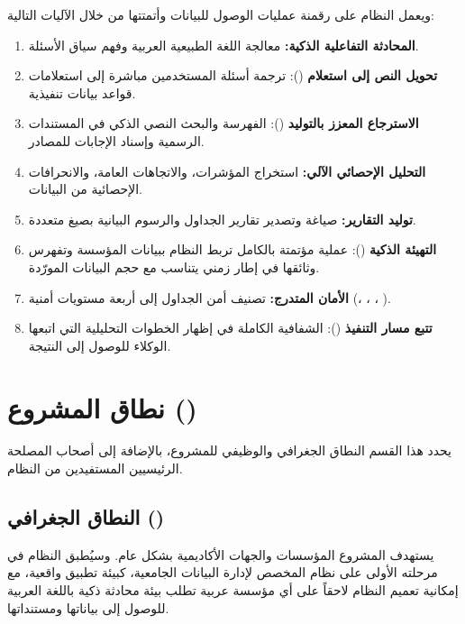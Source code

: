 ويعمل النظام على رقمنة عمليات الوصول للبيانات وأتمتتها من خلال الآليات
التالية:

\begin{enumerate}
  \item \textbf{المحادثة التفاعلية الذكية:} معالجة اللغة الطبيعية العربية وفهم
        سياق الأسئلة.
  \item \textbf{تحويل النص إلى استعلام} (): ترجمة أسئلة المستخدمين
        مباشرة إلى استعلامات قواعد بيانات تنفيذية.
  \item \textbf{الاسترجاع المعزز بالتوليد} (): الفهرسة والبحث النصي
        الذكي في المستندات الرسمية وإسناد الإجابات للمصادر.
  \item \textbf{التحليل الإحصائي الآلي:} استخراج المؤشرات، والاتجاهات العامة،
        والانحرافات الإحصائية من البيانات.
  \item \textbf{توليد التقارير:} صياغة وتصدير تقارير الجداول والرسوم البيانية
        بصيغ متعددة.
  \item \textbf{التهيئة الذكية} (): عملية مؤتمتة بالكامل
        تربط النظام ببيانات المؤسسة وتفهرس وثائقها في إطار زمني يتناسب مع
        حجم البيانات المورّدة.
  \item \textbf{الأمان المتدرج:} تصنيف أمن الجداول إلى أربعة مستويات أمنية
        (، ، ، ).
  \item \textbf{تتبع مسار التنفيذ} (): الشفافية الكاملة في
        إظهار الخطوات التحليلية التي اتبعها الوكلاء للوصول إلى النتيجة.
\end{enumerate}

\section{نطاق المشروع ()}
\label{sec:scope}

يحدد هذا القسم النطاق الجغرافي والوظيفي للمشروع، بالإضافة إلى أصحاب المصلحة
الرئيسيين المستفيدين من النظام.

\subsection{النطاق الجغرافي ()}
يستهدف المشروع المؤسسات والجهات الأكاديمية بشكل عام. وسيُطبق النظام في
مرحلته الأولى على نظام  المخصص لإدارة البيانات الجامعية،
كبيئة تطبيق واقعية، مع إمكانية تعميم النظام لاحقاً على أي مؤسسة عربية تطلب
بيئة محادثة ذكية باللغة العربية للوصول إلى بياناتها ومستنداتها.

